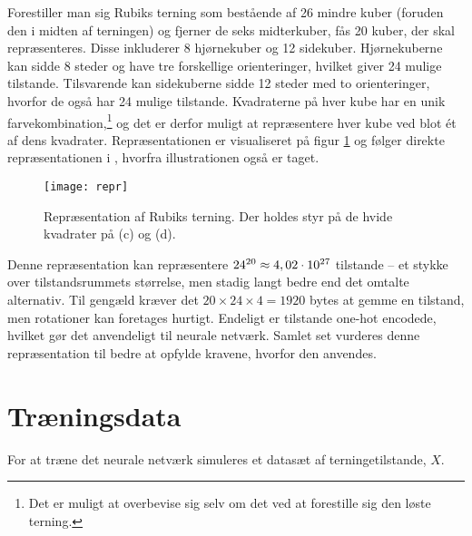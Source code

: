 \documentclass[../main.tex]{subfiles}
\begin{document}
Forestiller man sig Rubiks terning som bestående af 26 mindre kuber (foruden den i midten af terningen) og fjerner de seks midterkuber, fås 20 kuber, der skal repræsenteres.
Disse inkluderer 8 hjørnekuber og 12 sidekuber.
Hjørnekuberne kan sidde 8 steder og have tre forskellige orienteringer, hvilket giver 24 mulige tilstande.
Tilsvarende kan sidekuberne sidde 12 steder med to orienteringer, hvorfor de også har 24 mulige tilstande.
Kvadraterne på hver kube har en unik farvekombination,\footnote{Det er muligt at overbevise sig selv om det ved at forestille sig den løste terning.} og det er derfor muligt at repræsentere hver kube ved blot ét af dens kvadrater.
Repræsentationen er visualiseret på figur \ref{fig:kuberepr} og følger direkte repræsentationen i \cite{HumansBeGone}, hvorfra illustrationen også er taget.
\begin{figure}
	\centering
	\texttt{[image: repr]}
	\caption{Repræsentation af Rubiks terning. Der holdes styr på de hvide kvadrater på (c) og (d). \cite{HumansBeGone}}\label{fig:kuberepr}
\end{figure}
Denne repræsentation kan repræsentere $ 24^{20}\approx 4,02\cdot10^{27} $ tilstande -- et stykke over tilstandsrummets størrelse, men stadig langt bedre end det omtalte alternativ.
Til gengæld kræver det $ 20\times 24\times 4=1920 $ bytes at gemme en tilstand, men rotationer kan foretages hurtigt.
Endeligt er tilstande one-hot encodede, hvilket gør det anvendeligt til neurale netværk.
Samlet set vurderes denne repræsentation til bedre at opfylde kravene, hvorfor den anvendes.

\section{Træningsdata}

For at træne det neurale netværk simuleres et datasæt af terningetilstande, $ X $.
\end{document}
